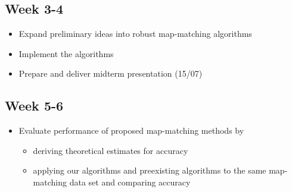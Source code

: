 \documentclass{article}
\numberwithin{equation}{section}
\theoremstyle{definition}
\begin{document}

\subsection*{Week 3-4}
\begin{itemize}[noitemsep]
    \item Expand preliminary ideas into robust map-matching algorithms
    \item Implement the algorithms
     \item Prepare and deliver midterm presentation (15/07)
\end{itemize}


\subsection*{Week 5-6}
\begin{itemize}[noitemsep]
    \item Evaluate performance of proposed map-matching methods by
    \begin{itemize}
        \item deriving theoretical estimates for accuracy
        \item applying our algorithms and preexisting algorithms to the same map-matching data set and comparing accuracy 
    \end{itemize}
    
\end{itemize}

\end{document}
